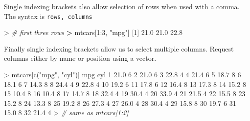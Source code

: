 \documentclass[
]{book}
\newenvironment{Shaded}{\begin{snugshade}}{\end{snugshade}}
\newcommand{\CommentTok}[1]{\textcolor[rgb]{0.56,0.35,0.01}{\textit{#1}}}
\newcommand{\DecValTok}[1]{\textcolor[rgb]{0.00,0.00,0.81}{#1}}
\newcommand{\ErrorTok}[1]{\textcolor[rgb]{0.64,0.00,0.00}{\textbf{#1}}}
\newcommand{\FloatTok}[1]{\textcolor[rgb]{0.00,0.00,0.81}{#1}}
\newcommand{\FunctionTok}[1]{\textcolor[rgb]{0.00,0.00,0.00}{#1}}
\newcommand{\NormalTok}[1]{#1}
\newcommand{\SpecialCharTok}[1]{\textcolor[rgb]{0.00,0.00,0.00}{#1}}
\newcommand{\StringTok}[1]{\textcolor[rgb]{0.31,0.60,0.02}{#1}}
\begin{document}
Single indexing brackets also allow selection of rows when used with a comma. The syntax is \texttt{rows,\ columns}

\begin{Shaded}
\begin{Highlighting}[]
\SpecialCharTok{\textgreater{}} \CommentTok{\# first three rows}
\ErrorTok{\textgreater{}}\NormalTok{ mtcars[}\DecValTok{1}\SpecialCharTok{:}\DecValTok{3}\NormalTok{, }\StringTok{"mpg"}\NormalTok{]}
\NormalTok{[}\DecValTok{1}\NormalTok{] }\FloatTok{21.0} \FloatTok{21.0} \FloatTok{22.8}
\end{Highlighting}
\end{Shaded}

Finally single indexing brackets allow us to select multiple columns. Request columns either by name or position using a vector.

\begin{Shaded}
\begin{Highlighting}[]
\SpecialCharTok{\textgreater{}}\NormalTok{ mtcars[}\FunctionTok{c}\NormalTok{(}\StringTok{"mpg"}\NormalTok{, }\StringTok{"cyl"}\NormalTok{)] }
\NormalTok{    mpg cyl}
\DecValTok{1}  \FloatTok{21.0}   \DecValTok{6}
\DecValTok{2}  \FloatTok{21.0}   \DecValTok{6}
\DecValTok{3}  \FloatTok{22.8}   \DecValTok{4}
\DecValTok{4}  \FloatTok{21.4}   \DecValTok{6}
\DecValTok{5}  \FloatTok{18.7}   \DecValTok{8}
\DecValTok{6}  \FloatTok{18.1}   \DecValTok{6}
\DecValTok{7}  \FloatTok{14.3}   \DecValTok{8}
\DecValTok{8}  \FloatTok{24.4}   \DecValTok{4}
\DecValTok{9}  \FloatTok{22.8}   \DecValTok{4}
\DecValTok{10} \FloatTok{19.2}   \DecValTok{6}
\DecValTok{11} \FloatTok{17.8}   \DecValTok{6}
\DecValTok{12} \FloatTok{16.4}   \DecValTok{8}
\DecValTok{13} \FloatTok{17.3}   \DecValTok{8}
\DecValTok{14} \FloatTok{15.2}   \DecValTok{8}
\DecValTok{15} \FloatTok{10.4}   \DecValTok{8}
\DecValTok{16} \FloatTok{10.4}   \DecValTok{8}
\DecValTok{17} \FloatTok{14.7}   \DecValTok{8}
\DecValTok{18} \FloatTok{32.4}   \DecValTok{4}
\DecValTok{19} \FloatTok{30.4}   \DecValTok{4}
\DecValTok{20} \FloatTok{33.9}   \DecValTok{4}
\DecValTok{21} \FloatTok{21.5}   \DecValTok{4}
\DecValTok{22} \FloatTok{15.5}   \DecValTok{8}
\DecValTok{23} \FloatTok{15.2}   \DecValTok{8}
\DecValTok{24} \FloatTok{13.3}   \DecValTok{8}
\DecValTok{25} \FloatTok{19.2}   \DecValTok{8}
\DecValTok{26} \FloatTok{27.3}   \DecValTok{4}
\DecValTok{27} \FloatTok{26.0}   \DecValTok{4}
\DecValTok{28} \FloatTok{30.4}   \DecValTok{4}
\DecValTok{29} \FloatTok{15.8}   \DecValTok{8}
\DecValTok{30} \FloatTok{19.7}   \DecValTok{6}
\DecValTok{31} \FloatTok{15.0}   \DecValTok{8}
\DecValTok{32} \FloatTok{21.4}   \DecValTok{4}
\SpecialCharTok{\textgreater{}} \CommentTok{\# same as mtcars[1:2] }
\end{Highlighting}
\end{Shaded}
\end{document}
